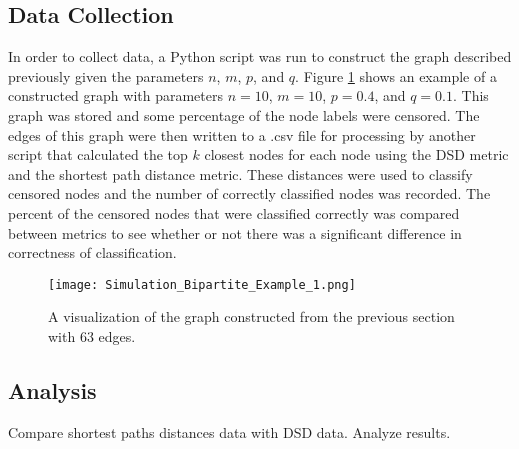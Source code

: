 \subsection{Data Collection}
\noindent
In order to collect data, a Python script was run to construct the graph described previously given the parameters $n$, $m$, $p$, and $q$. Figure \ref{fig:bip_ex_1} shows an example of a constructed graph with parameters $n=10$, $m=10$, $p=0.4$, and $q=0.1$. This graph was stored and some percentage of the node labels were censored. The edges of this graph were then written to a .csv file for processing by another script that calculated the top $k$ closest nodes for each node using the DSD metric and the shortest path distance metric. These distances were used to classify censored nodes and the number of correctly classified nodes was recorded. The percent of the censored nodes that were classified correctly was compared between metrics to see whether or not there was a significant difference in correctness of classification.\\

\begin{figure}[!ht]
\centering
\texttt{[image: Simulation\_Bipartite\_Example\_1.png]}
\caption{A visualization of the graph constructed from the previous section with 63 edges.}
\label{fig:bip_ex_1}
\end{figure}


\subsection{Analysis}
\noindent
Compare shortest paths distances data with DSD data. Analyze results.

